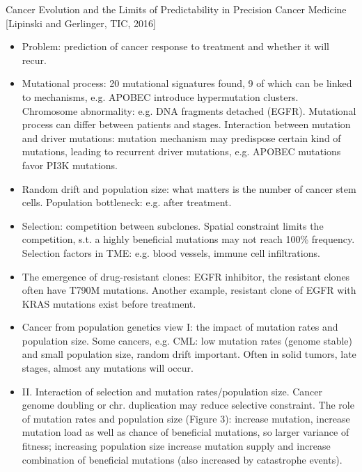 \documentclass{report}
\begin{document}
Cancer Evolution and the Limits of Predictability in Precision Cancer Medicine [Lipinski and Gerlinger, TIC, 2016]
\begin{itemize}
	
	\item Problem: prediction of cancer response to treatment and whether it will recur. 
	
	\item Mutational process: 20 mutational signatures found, 9 of which can be linked to mechanisms, e.g. APOBEC introduce hypermutation clusters. Chromosome abnormality: e.g. DNA fragments detached (EGFR). Mutational process can differ between patients and stages. Interaction between mutation and driver mutations: mutation mechanism may predispose certain kind of mutations, leading to recurrent driver mutations, e.g. APOBEC mutations favor PI3K mutations.      
	
	\item Random drift and population size: what matters is the number of cancer stem cells. Population bottleneck: e.g. after treatment. 
	
	\item Selection: competition between subclones. Spatial constraint limits the competition, s.t. a highly beneficial mutations may not reach 100\% frequency. Selection factors in TME: e.g. blood vessels, immune cell infiltrations. 
	
	\item The emergence of drug-resistant clones: EGFR inhibitor, the resistant clones often have T790M mutations. Another example, resistant clone of EGFR with KRAS mutations exist before treatment. 
	
	\item Cancer from population genetics view I: the impact of mutation rates and population size. Some cancers, e.g. CML: low mutation rates (genome stable) and small population size, random drift important. Often in solid tumors, late stages, almost any mutations will occur. 
	
	\item II. Interaction of selection and mutation rates/population size. Cancer genome doubling or chr. duplication may reduce selective constraint. The role of mutation rates and population size (Figure 3): increase mutation, increase mutation load as well as chance of beneficial mutations, so larger variance of fitness; increasing population size increase mutation supply and increase combination of beneficial mutations (also increased by catastrophe events). 
	

\end{itemize}
\end{document}
